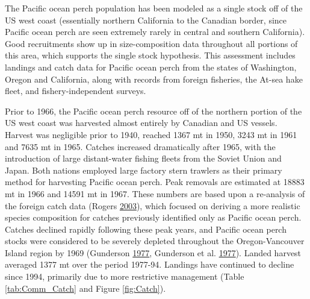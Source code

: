 \documentclass[12pt,]{article}
\begin{document}
The Pacific ocean perch population has been modeled as a single stock
off of the US west coast (essentially northern California to the
Canadian border, since Pacific ocean perch are seen extremely rarely in
central and southern California). Good recruitments show up in
size-composition data throughout all portions of this area, which
supports the single stock hypothesis. This assessment includes landings
and catch data for Pacific ocean perch from the states of Washington,
Oregon and California, along with records from foreign fisheries, the
At-sea hake fleet, and fishery-independent surveys.

Prior to 1966, the Pacific ocean perch resource off of the northern
portion of the US west coast was harvested almost entirely by Canadian
and US vessels. Harvest was negligible prior to 1940, reached 1367 mt in
1950, 3243 mt in 1961 and 7635 mt in 1965. Catches increased
dramatically after 1965, with the introduction of large distant-water
fishing fleets from the Soviet Union and Japan. Both nations employed
large factory stern trawlers as their primary method for harvesting
Pacific ocean perch. Peak removals are estimated at 18883 mt in 1966 and
14591 mt in 1967. These numbers are based upon a re-analysis of the
foreign catch data (Rogers
\protect\hyperlink{ref-rogers_species_2003}{2003}), which focused on
deriving a more realistic species composition for catches previously
identified only as Pacific ocean perch. Catches declined rapidly
following these peak years, and Pacific ocean perch stocks were
considered to be severely depleted throughout the Oregon-Vancouver
Island region by 1969 (Gunderson
\protect\hyperlink{ref-gunderson_population_1977}{1977}, Gunderson et
al. \protect\hyperlink{ref-gunderson_status_1977}{1977}). Landed harvest
averaged 1377 mt over the period 1977-94. Landings have continued to
decline since 1994, primarily due to more restrictive management (Table
\ref{tab:Comm_Catch} and Figure \ref{fig:Catch}).
\end{document}
